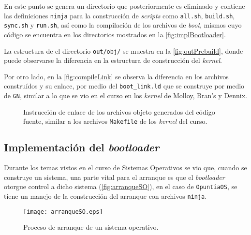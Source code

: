 	
	\clearpage
	En este punto se genera un directorio que posteriormente es eliminado y contiene las definiciones \texttt{ninja} para la construcción de \textit{scripts} como \texttt{all.sh}, \texttt{build.sh}, \texttt{sync.sh} y \texttt{run.sh}, así como la compilación de los archivos de \textit{boot}, mismos cuyo código se encuentra en los directorios mostrados en la \autoref{fig:implBootloader}.
	
	
	
	La estructura de el directorio \texttt{out/obj/} se muestra en la \autoref{fig:outPrebuild}, donde puede observarse la diferencia en la estructura de construcción del \textit{kernel}.
	
	
	
	Por otro lado, en la \autoref{fig:compileLink} se observa la diferencia en los archivos construídos y su enlace, por medio del \texttt{boot\_link.ld} que se construye por medio de \texttt{GN}, similar a lo que se vio en el curso en los \textit{kernel} de Molloy, Bran's y Dennix.

	\begin{figure}[ht]
		\centering
		\vspace*{0.3cm}
		\caption{
			Instrucción de enlace de los archivos objeto generados del código fuente, similar a los archivos \texttt{Makefile} de los \textit{kernel} del curso.
			\label{fig:compileLink}
		}
	\end{figure}
	
	
	

\newpage
\subsection{Implementación del \textit{bootloader} \label{ssec:implBootloader}}
	Durante los temas vistos en el curso de Sistemas Operativos se vio que, 
	cuando se construye un sistema, una parte vital para el arranque es que el \textit{bootloader} otorgue control a dicho sistema (\autoref{fig:arranqueSO}), en el caso de \texttt{OpuntiaOS}, se tiene un manejo de la construcción del arranque con archivos \texttt{ninja}.
	\begin{figure}[ht]
		\centering
		\texttt{[image: arranqueSO.eps]}
		\caption{
			Proceso de arranque de un sistema operativo.
			\label{fig:arranqueSO}
		}
	\end{figure}
	
